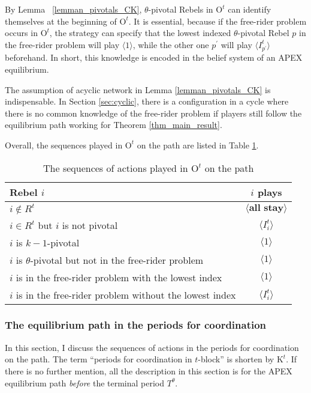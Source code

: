 \documentclass[12pt,letter]{article}
\newcommand{\Kappa}{\mathrm{K}}
\newcommand{\Omicron}{\mathrm{O}}
\theoremstyle{definition}
\theoremstyle{remark}
\theoremstyle{claim}
\begin{document}
By Lemma ~\ref{lemman_pivotals_CK}, $\theta$-pivotal Rebels in $\Omicron^t$ can identify themselves at the beginning of $\Omicron^t$. It is essential, because if the free-rider problem occurs in $\Omicron^t$, the strategy can specify that the lowest indexed $\theta$-pivotal Rebel $p$ in the free-rider problem will play $\langle 1 \rangle$, while the other one $p^{'}$ will play $\langle I^t_{p^{'}} \rangle$ beforehand. In short, this knowledge is encoded in the belief system of an APEX equilibrium.

The assumption of acyclic network in Lemma \ref{lemman_pivotals_CK} is indispensable. In Section \ref{sec:cyclic}, there is a configuration in a cycle where there is no common knowledge of the free-rider problem if players still follow the equilibrium path working for Theorem \ref{thm_main_result}. 

Overall, the sequences played in $\Omicron^t$ on the path are listed in Table \ref{Table_msg_RP_path}.

\begin{table}[!htbp]
\caption{The sequences of actions played in $\Omicron^t$ on the path}
\label{Table_msg_RP_path}
\begin{center}
\begin{tabular}{l c}
Rebel $i$ & $i$ plays\\
\hline
\hline
$i\notin R^t$				& $\langle \textbf{all stay} \rangle$  \\
$i\in R^t$ but $i$ is not pivotal	 					 			& $\langle I^t_i \rangle$  \\
$i$ is $k-1$-pivotal	 					 			& $\langle 1 \rangle$  \\
$i$ is $\theta$-pivotal but not in the free-rider problem	 					 			& $\langle 1 \rangle$  \\
$i$ is in the free-rider problem with the lowest index	 					 			& $\langle 1 \rangle$  \\
$i$ is in the free-rider problem without the lowest index	 					 			& $\langle I^t_i \rangle$  \\
\hline
\end{tabular}
\end{center}
\end{table}


\subsubsection{The equilibrium path in the periods for coordination}
\label{sec:eq_cd}
In this section, I discuss the sequences of actions in the periods for coordination on the path. The term ``periods for coordination in $t$-block'' is shorten by $\Kappa^{t}$. If there is no further mention, all the description in this section is for the APEX equilibrium path \textit{before} the terminal period $T^{\theta}$. 
\end{document}
